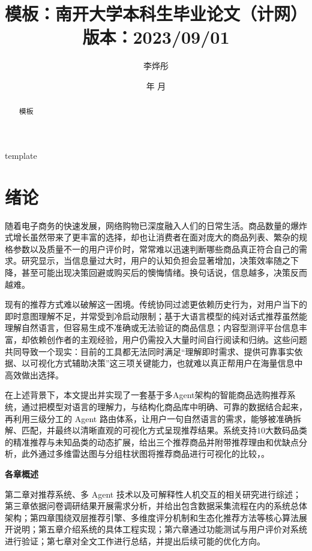 \documentclass{nkuthesis}
\title{模板：南开大学本科生毕业论文（计网）\\ 版本：2023/09/01}
\author{李烨彤}
\date{\the\year 年 \the\month 月}
\begin{document}

\maketitle


\begin{abstract}
模板
\end{abstract}
\begin{abstract*}
template
\end{abstract*}

\tableofcontents


\section{绪论}

随着电子商务的快速发展，网络购物已深度融入人们的日常生活。商品数量的爆炸式增长虽然带来了更丰富的选择，却也让消费者在面对庞大的商品列表、繁杂的规格参数以及质量不一的用户评价时，常常难以迅速判断哪些商品真正符合自己的需求。研究显示，当信息量过大时，用户的认知负担会显著增加，决策效率随之下降，甚至可能出现决策回避或购买后的懊悔情绪。换句话说，信息越多，决策反而越难。

现有的推荐方式难以破解这一困境。传统协同过滤更依赖历史行为，对用户当下的即时意图理解不足，并常受到冷启动限制；基于大语言模型的纯对话式推荐虽然能理解自然语言，但容易生成不准确或无法验证的商品信息；内容型测评平台信息丰富，却依赖创作者的主观经验，用户仍需投入大量时间自行阅读和归纳。这些问题共同导致一个现实：目前的工具都无法同时满足“理解即时需求、提供可靠事实依据、以可视化方式辅助决策”这三项关键能力，也就难以真正帮用户在海量信息中高效做出选择。

在上述背景下，本文提出并实现了一套基于多Agent架构的智能商品选购推荐系统，通过把模型对语言的理解力，与结构化商品库中明确、可靠的数据结合起来，再利用三级分工的 Agent 路由体系，让用户一句自然语言的需求，能够被准确拆解、匹配，并最终以清晰直观的可视化方式呈现推荐结果。系统支持10大数码品类的精准推荐与未知品类的动态扩展，给出三个推荐商品并附带推荐理由和优缺点分析，此外通过多维雷达图与分组柱状图将推荐商品进行可视化的比较，\cite{Possible}。

\textbf{各章概述}

第二章对推荐系统、多 Agent 技术以及可解释性人机交互的相关研究进行综述；第三章依据问卷调研结果开展需求分析，并给出包含数据采集流程在内的系统总体架构；第四章围绕双层推荐引擎、多维度评分机制和生态化推荐方法等核心算法展开说明；第五章介绍系统的具体工程实现；第六章通过功能测试与用户评价对系统进行验证；第七章对全文工作进行总结，并提出后续可能的优化方向。
\end{document}
